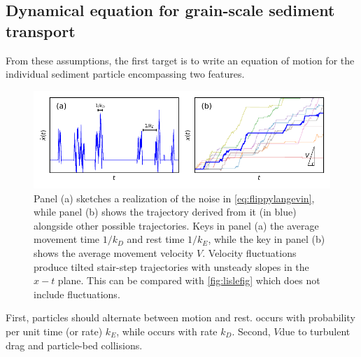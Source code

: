 \subsection{Dynamical equation for grain-scale sediment transport}
From these assumptions, the first target is to write an equation of motion for the individual sediment particle encompassing two features.
\begin{figure}
	\centerline{\includegraphics{./figures/ch2/fig0mod.pdf}}
	\caption{Panel (a) sketches a realization of the noise in \DIFdelbeginFL {}\DIFdelendFL \DIFaddbeginFL {}\DIFaddendFL \ref{eq:flippylangevin}, while panel (b) shows the trajectory derived from it (in blue) alongside other possible trajectories. Keys in panel (a) \DIFdelbeginFL {}\DIFdelendFL \DIFaddbeginFL {}\DIFaddendFL the average movement time $1/k_D$ and rest time $1/k_E$, while the key in panel (b) shows the average movement velocity $V$. Velocity fluctuations produce tilted stair-step trajectories with unsteady slopes in the $x-t$ plane. This can be compared with \DIFdelbeginFL {}\DIFdelendFL \DIFaddbeginFL {}\DIFaddendFL \ref{fig:lislefig} which does not include fluctuations.}
	\label{fig:fluxxy0}
\end{figure}
First, particles should alternate between motion and rest.
\DIFdelbegin {}\DIFdelend \DIFaddbegin {}\DIFaddend occurs with probability per unit time (or rate) $k_E$, while \DIFdelbegin {}\DIFdelend \DIFaddbegin {}\DIFaddend occurs with rate $k_D$.
Second, \DIFdelbegin {}\DIFdelend \DIFaddbegin {}\DIFaddend $V$\DIFdelbegin {}\DIFdelend \DIFaddbegin \DIFadd{, }\DIFaddend due to turbulent drag and particle-bed collisions.


